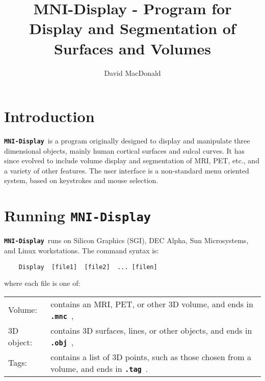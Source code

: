 
\title{{\bf MNI-Display} - Program for Display and Segmentation of Surfaces and Volumes}
\author{David MacDonald}

\newcommand{\ident}[1]{{\bf\tt #1}\ }
\newcommand{\display}{\ident{MNI-Display}}
\newcommand{\menu}[1]{{\scriptsize \fbox{\bf #1}}}
\newcommand{\menutwo}[2]{{\scriptsize \fbox{\bf #1}/\fbox{\bf #2}}}
\newcommand{\menuthree}[3]{{\scriptsize \fbox{\bf #1}/\fbox{\bf #2}/\fbox{\bf #3}}}




\maketitle

\newpage

\tableofcontents

\newpage

\section{Introduction}

\display is a program originally designed to display and manipulate
three dimensional objects,
mainly human cortical surfaces and sulcal curves.  It has since evolved to
include volume display and segmentation of MRI, PET, etc., and a variety of
other features.  The user interface is a non-standard menu oriented system,
based on keystrokes and mouse selection.

\section{Running \display}

\display runs on Silicon Graphics (SGI), DEC Alpha, Sun Microsystems,
and Linux workstations.
The command syntax is:

\begin{verbatim}
    Display  [file1]  [file2]  ... [filen]
\end{verbatim}

where each file is one of:

\vspace{.5cm}

\begin{tabular}[t]{p{2cm}p{8.5cm}}
Volume: &  contains an MRI, PET, or other 3D volume,
           and ends in \ident{.mnc}, \\

3D object: &  contains 3D surfaces, lines, or other objects, and
              ends in \ident{.obj}, \\

Tags:  & contains a list of 3D points, such as those chosen from a volume,
         and ends in \ident{.tag}.
\end{tabular}

